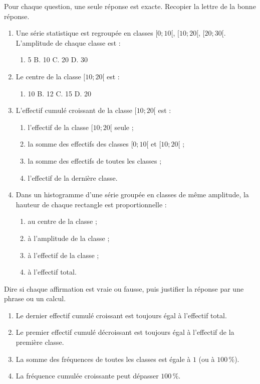 \documentclass[11pt]{article}
\begin{document}
\begin{exercice}
Pour chaque question, une seule réponse est exacte. Recopier la lettre de la bonne réponse.
\begin{enumerate}
\item Une série statistique est regroupée en classes $[0 ; 10[$, $[10 ; 20[$, $[20 ; 30[$. L'amplitude de chaque classe est :
\begin{enumerate}
\item[A.] 5 \quad B. 10 \quad C. 20 \quad D. 30
\end{enumerate}
\item Le centre de la classe $[10 ; 20[$ est :
\begin{enumerate}
\item[A.] 10 \quad B. 12 \quad C. 15 \quad D. 20
\end{enumerate}
\item L'effectif cumulé croissant de la classe $[10 ; 20[$ est :
\begin{enumerate}
\item[A.] l'effectif de la classe $[10 ; 20[$ seule ;
\item[B.] la somme des effectifs des classes $[0 ; 10[$ et $[10 ; 20[$ ;
\item[C.] la somme des effectifs de toutes les classes ;
\item[D.] l'effectif de la dernière classe.
\end{enumerate}
\item Dans un histogramme d'une série groupée en classes de même amplitude, la hauteur de chaque rectangle est proportionnelle :
\begin{enumerate}
\item[A.] au centre de la classe ;
\item[B.] à l'amplitude de la classe ;
\item[C.] à l'effectif de la classe ;
\item[D.] à l'effectif total.
\end{enumerate}
\end{enumerate}
\end{exercice}

\begin{exercice}
Dire si chaque affirmation est vraie ou fausse, puis justifier la réponse par une phrase ou un calcul.
\begin{enumerate}
\item Le dernier effectif cumulé croissant est toujours égal à l'effectif total.
\item Le premier effectif cumulé décroissant est toujours égal à l'effectif de la première classe.
\item La somme des fréquences de toutes les classes est égale à $1$ (ou à $100\,\%$).
\item La fréquence cumulée croissante peut dépasser $100\,\%$.
\end{enumerate}
\end{exercice}
\end{document}
